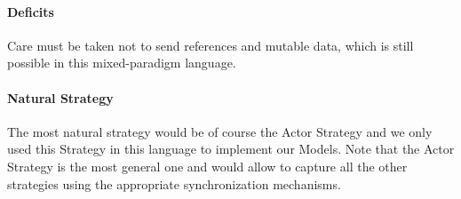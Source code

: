 \paragraph{Deficits}
Care must be taken not to send references and mutable data, which is still possible in this mixed-paradigm language.

\paragraph{Natural Strategy}
The most natural strategy would be of course the Actor Strategy and we only used this Strategy in this language to implement our Models. Note that the Actor Strategy is the most general one and would allow to capture all the other strategies using the appropriate synchronization mechanisms.